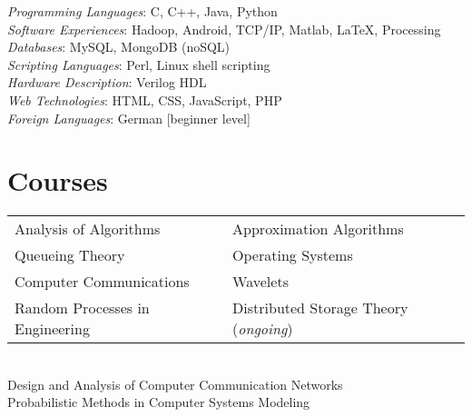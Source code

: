 \documentclass[margin,line]{resume}
\begin{document}
\begin{resume}
    \textsl{Programming Languages}: C, C++, Java, Python\\
    \textsl{Software Experiences}: Hadoop, Android, TCP/IP, Matlab, \LaTeX, Processing\\
    \textsl{Databases}: MySQL, MongoDB (noSQL)\\
    \textsl{Scripting Languages}: Perl, Linux shell scripting \\
    \textsl{Hardware Description}: Verilog HDL \\
    \textsl{Web Technologies}: HTML, CSS, JavaScript, PHP \\
    \textsl{Foreign Languages}: German [beginner level]


\section{\mysidestyle Courses} 


\begin{tabular}{@{}p{7cm}p{7cm}}
Analysis of Algorithms       &  Approximation Algorithms                   \\
Queueing Theory  & Operating Systems \\
Computer Communications & Wavelets \\
Random Processes in Engineering  & Distributed Storage Theory (\emph{ongoing})
\end{tabular} \\
Design and Analysis of Computer Communication Networks \\
Probabilistic Methods in Computer Systems Modeling    \\




\end{resume}
\end{document}
